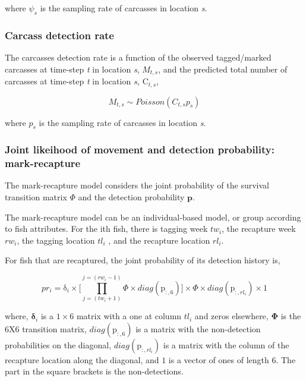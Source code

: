 \documentclass[
  letterpaper,
  DIV=11,
  numbers=noendperiod]{scrartcl}
\begin{document}
where \(\psi_s\) is the sampling rate of carcasses in location \emph{s}.

\hypertarget{carcass-detection-rate}{%
\subsubsection{Carcass detection rate}\label{carcass-detection-rate}}

The carcasses detection rate is a function of the observed tagged/marked
carcasses at time-step \emph{t} in location \emph{s}, \(M_{t,s}\), and
the predicted total number of carcasses at time-step \emph{t} in
location \emph{s,} \(\mathrm{C}_{t,s}\),

\[ M_{t,s} \sim Poisson(C_{t,s}p_s ) \]

where \(p_s\) is the sampling rate of carcasses in location \emph{s}.

\hypertarget{joint-likeihood-of-movement-and-detection-probability-mark-recapture}{%
\subsubsection{Joint likeihood of movement and detection probability:
mark-recapture}\label{joint-likeihood-of-movement-and-detection-probability-mark-recapture}}

The mark-recapture model considers the joint probability of the survival
transition matrix \(\Phi\) and the detection probability \(\mathbf{p}\).

The mark-recapture model can be an individual-based model, or group
according to fish attributes. For the ith fish, there is tagging week
\(tw_i\), the recapture week \(rw_i\), the tagging location \(tl_i\) ,
and the recapture location \(rl_i\).

For fish that are recaptured, the joint probability of its detection
history is,

\[
pr_i = \boldsymbol{\mathrm{\delta}}_i \times \biggr[ \prod_{j=(tw_i+1)}^{j=(rw_i-1)}\Phi \times diag(\mathrm{p}_{:,6})\biggr] \times \Phi \times diag(\mathrm{p}_{:,rl_i}) \times \mathrm{1} 
\]

where, \(\boldsymbol{\delta}_i\) is a \(1\times 6\) matrix with a one at
column \(tl_i\) and zeros elsewhere, \(\boldsymbol{\Phi}\) is the 6X6
transition matrix, \(diag(\mathrm{p}_{:,6})\) is a matrix with the
non-detection probabilities on the diagonal,
\(diag(\mathrm{p}_{:,rl_i})\) is a matrix with the column of the
recapture location along the diagonal, and \(\mathrm{1}\) is a vector of
ones of length 6. The part in the square brackets is the non-detections.
\end{document}
